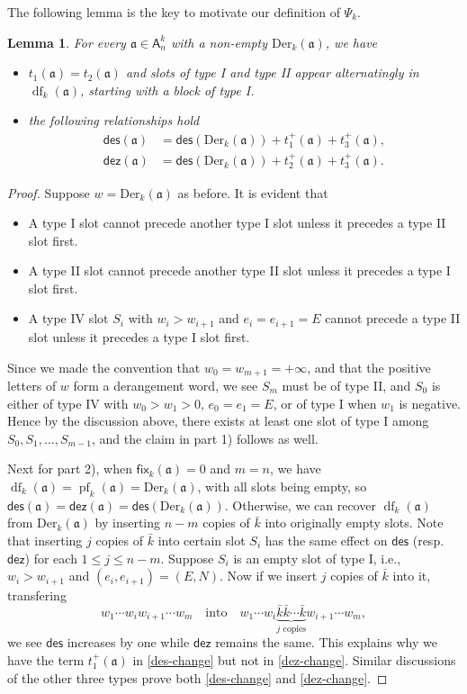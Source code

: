 \documentclass[12pt]{amsart} %
\numberwithin{equation}{section}
\theoremstyle{plain}
\newtheorem{lemma}[theorem]{Lemma}
\theoremstyle{definition}
\newcommand\A{\mathsf{A}}
\def\dez{\mathsf{dez}}
\def\Der{\mathrm{Der}}
\def\fix{\mathsf{fix}}
\def\des{\mathsf{des}}
\def\a{\mathfrak{a}}
\def\df{\operatorname{df}}
\def\pf{\operatorname{pf}}
\def\neg#1{{{{\bar#1}}}}
\begin{document}
The following lemma is the key to motivate our definition of $\Psi_k$.
\begin{lemma}\label{block type}
For every $\a\in\A_n^k$ with a non-empty $\Der_k(\a)$, we have
\begin{itemize}
	\item[1)] $t_1(\a)=t_2(\a)$ and slots of type I and type II appear alternatingly in $\df_k(\a)$, starting with a block of type I. 
	\item[2)] the following relationships hold
	\begin{align}
	\label{des-change}\des(\a) &=\des(\Der_k(\a))+t_1^{+}(\a)+t_3^{+}(\a),\\
	\label{dez-change}\dez(\a) &=\des(\Der_k(\a))+t_2^{+}(\a)+t_3^{+}(\a).
	\end{align}
\end{itemize}
\end{lemma}
\begin{proof}
Suppose $w=\Der_k(\a)$ as before. It is evident that 
\begin{itemize}
\item A type I slot cannot precede another type I slot unless it precedes a type II slot first. 
\item A type II slot cannot precede another type II slot unless it precedes a type I slot first.
\item A type IV slot $S_i$ with $w_i>w_{i+1}$ and $e_i=e_{i+1}=E$ cannot precede a type II slot unless it precedes a type I slot first.
\end{itemize}
Since we made the convention that $w_0=w_{m+1}=+\infty$, and that the positive letters of $w$ form a derangement word, we see $S_m$ must be of type II, and $S_0$ is either of type IV with $w_0>w_1>0$, $e_0=e_1=E$, or of type I when $w_1$ is negative. Hence by the discussion above, there exists at least one slot of type I among $S_0,S_1,\ldots,S_{m-1}$, and the claim in part 1) follows as well.

Next for part 2), when $\fix_k(\a)=0$ and $m=n$, we have $\df_k(\a)=\pf_k(\a)=\Der_k(\a)$, with all slots being empty, so $\des(\a)=\dez(\a)=\des(\Der_k(\a))$. Otherwise, we can recover $\df_k(\a)$ from $\Der_k(\a)$ by inserting $n-m$ copies of $\neg k$ into originally empty slots. Note that inserting $j$ copies of $\neg k$ into certain slot $S_i$ has the same effect on $\des$ (resp. $\dez$) for each $1\le j\le n-m$. Suppose $S_i$ is an empty slot of type I, i.e., $w_{i} > w_{i+1}$ and $(e_i,e_{i+1})=(E,N)$. Now if we insert $j$ copies of $\neg k$ into it, transfering
$$w_1\cdots w_i w_{i+1}\cdots w_m \quad \text{into} \quad
	w_1\cdots w_i\underbrace{\bar k \bar k\cdots \bar k}_{\text{$j$ copies}} w_{i+1}\cdots w_m,
$$
we see $\des$ increases by one while $\dez$ remains the same. This explains why we have the term $t_1^+(\a)$ in \eqref{des-change} but not in \eqref{dez-change}. Similar discussions of the other three types prove both \eqref{des-change} and \eqref{dez-change}.
\end{proof}
\end{document}
